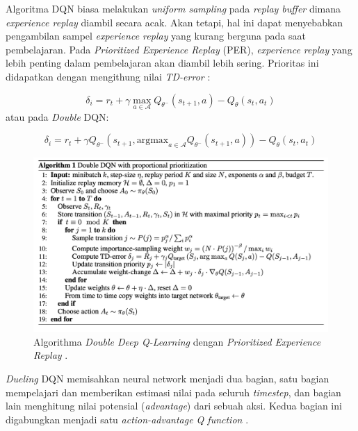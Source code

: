 Algoritma DQN biasa melakukan \emph{uniform sampling} pada \emph{replay buffer} dimana
\emph{experience replay} diambil secara acak. Akan tetapi, hal ini dapat menyebabkan pengambilan sampel \emph{experience replay} yang kurang berguna pada saat pembelajaran.
Pada \emph{Prioritized Experience Replay} (PER), \emph{experience replay} yang lebih penting dalam
pembelajaran akan diambil lebih sering.
Prioritas ini didapatkan dengan mengithung nilai \emph{TD-error} \citep{prioritizedER}:

\begin{equation}
  \delta_{i} = r_{t} + \gamma \max_{a\in\mathcal{A}}Q_{\theta ^{-}}(s_{t+1},a) - Q_{\theta}(s_{t},a_{t})
  \label{Eq:DQNTDErrorEquation}
\end{equation}
atau pada \emph{Double} DQN:

\begin{equation}
  \delta_{i} = r_{t} + \gamma Q_{\theta^{-}} \left(s_{t+1}, \text{argmax}_{a\in\mathcal{A}}Q_{\theta ^{-}}(s_{t+1},a)\right) - Q_{\theta}(s_{t},a_{t}) 
  \label{Eq:DDQNTDErrorEquation}
\end{equation}

\begin{figure}[H]
  \centering
    \includegraphics[scale=0.4]{gambar/ddqn_per_algorithm.png}
    \caption{Algorithma \emph{Double Deep Q-Learning} dengan \emph{Prioritized Experience Replay} \citep{prioritizedER}.}
    \label{fig:dqnPerAlgorithm}
\end{figure}

\emph{Dueling} DQN memisahkan neural network menjadi dua bagian, satu bagian mempelajari dan memberikan estimasi nilai pada seluruh \emph{timestep},
dan bagian lain menghitung nilai potensial (\emph{advantage}) dari sebuah aksi.
Kedua bagian ini digabungkan menjadi satu \emph{action-advantage Q function} \citep{duelingDQN}.

